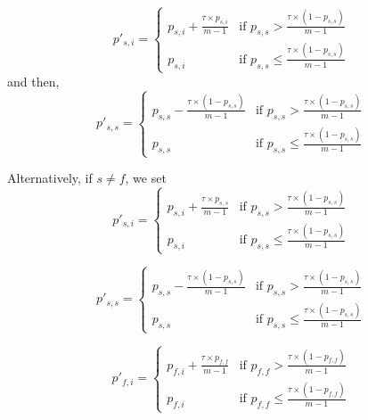 \documentclass[10pt,journal,compsoc]{IEEEtran}
\begin{document}
\begin{equation}
\label{eq:MAPTNotKillOneSameSI}
p'_{s, i} =
\begin{cases}
p_{s, i} + \displaystyle\frac{\tau \times p_{s, i}}{m - 1} & \text{if } p_{s, s} > \displaystyle\frac{\tau \times (1 - p_{s, s})}{m - 1} \\
p_{s, i}                                                   & \text{if } p_{s, s} \leq \displaystyle\frac{\tau \times (1 - p_{s, s})}{m - 1}
\end{cases}
\end{equation}
and then,
\begin{equation}
\label{eq:MAPTNotKillOneSameSS}
p'_{s, s} =
\begin{cases}
p_{s, s} - \displaystyle\frac{\tau \times (1 - p_{s, s})}{m - 1}  & \text{if } p_{s, s} > \displaystyle\frac{\tau \times (1 - p_{s, s})}{m - 1} \\
p_{s, s}                                                          & \text{if } p_{s, s} \leq \displaystyle\frac{\tau \times (1 - p_{s, s})}{m - 1}
\end{cases}
\end{equation}

Alternatively, if $s \ne f$, we set
\begin{equation}
\label{eq:MAPTNotKillOneNotSameSI}
p'_{s, i} =
\begin{cases}
p_{s, i} + \displaystyle\frac{\tau \times p_{s, s}}{m - 1} & \text{if } p_{s, s} > \displaystyle\frac{\tau \times (1 - p_{s, s})}{m - 1} \\
p_{s, i}                                                   & \text{if } p_{s, s} \leq \displaystyle\frac{\tau \times (1 - p_{s, s})}{m - 1}
\end{cases}
\end{equation}

\begin{equation}
\label{eq:MAPTNotKillOneNotSameSS}
p'_{s, s} =
\begin{cases}
p_{s, s} - \displaystyle\frac{\tau \times (1 - p_{s, s})}{m - 1} & \text{if } p_{s, s} > \displaystyle\frac{\tau \times (1 - p_{s, s})}{m - 1} \\
p_{s, s}                                                         & \text{if } p_{s, s} \leq \displaystyle\frac{\tau \times (1 - p_{s, s})}{m - 1}
\end{cases}
\end{equation}

\begin{equation}
\label{eq:MAPTNotKillOneNotSameFI}
p'_{f, i} =
\begin{cases}
p_{f, i} + \displaystyle\frac{\tau \times p_{f, f}}{m - 1} & \text{if } p_{f, f} > \displaystyle\frac{\tau \times (1 - p_{f, f})}{m - 1} \\
p_{f, i}                                                   & \text{if } p_{f, f} \leq \displaystyle\frac{\tau \times (1 - p_{f, f})}{m- 1}
\end{cases}
\end{equation}
\end{document}
